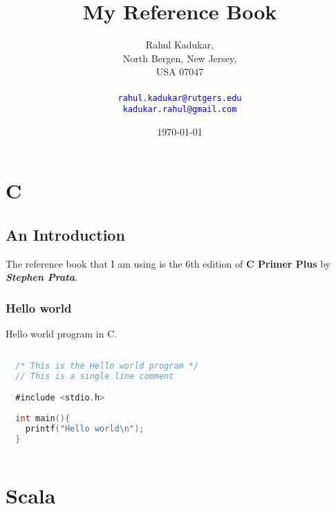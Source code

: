 \documentclass[11pt,a4paper,oneside]{book}
\begin{document}
\title{My Reference Book}
\author{
Rahul Kadukar, \\
North Bergen, New Jersey, \\
USA 07047 \\
\\
\texttt{\textcolor{blue}{rahul.kadukar@rutgers.edu}} \\
\texttt{\textcolor{blue}{kadukar.rahul@gmail.com}}
}
\date{\today}
\maketitle
\begingroup
\let\cleardoublepage\clearpage
\tableofcontents
\endgroup

\part{C}
\chapter{An Introduction}
The reference book that I am using is the 6th edition of \textbf{C Primer Plus}
by \textit{\textbf {Stephen Prata}}.
\section{Hello world}
Hello world program in C.
\noindent \begin{lstlisting}[title=Hello world program, language=C]
  
  /* This is the Hello world program */
  // This is a single line comment

  #include <stdio.h>
  
  int main(){
    printf("Hello world\n");
  }
  
\end{lstlisting}



\part{Scala}
\setcounter{chapter}{0}
\end{document}
